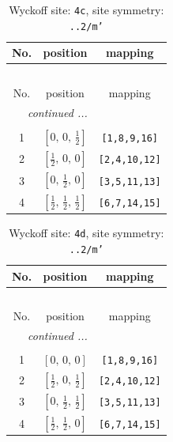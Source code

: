 \documentclass[fleqn,8pt]{jsarticle}
\begin{document}
\renewcommand{\arraystretch}{1.2}
\begin{longtable}{ccc}
\caption{Wyckoff site: {\tt 4c}, site symmetry: {\tt ..2/m'}}
 \\
 \hline \hline
No. & position & mapping \\ \hline \endfirsthead

\multicolumn{2}{l}{\tablename\ \thetable{}} \\
 \hline \hline
No. & position & mapping \\ \hline \endhead

 \hline \hline
\multicolumn{2}{r}{\footnotesize\it continued ...} \\ \endfoot

 \hline \hline
\multicolumn{2}{r}{} \\ \endlastfoot

1 & $\left[ 0,\, 0,\, \frac{1}{2} \right]$ & {\tt [1,8,9,16]} \\ \hline
2 & $\left[ \frac{1}{2},\, 0,\, 0 \right]$ & {\tt [2,4,10,12]} \\ \hline
3 & $\left[ 0,\, \frac{1}{2},\, 0 \right]$ & {\tt [3,5,11,13]} \\ \hline
4 & $\left[ \frac{1}{2},\, \frac{1}{2},\, \frac{1}{2} \right]$ & {\tt [6,7,14,15]} \\
\end{longtable}
\renewcommand{\arraystretch}{1.2}
\begin{longtable}{ccc}
\caption{Wyckoff site: {\tt 4d}, site symmetry: {\tt ..2/m'}}
 \\
 \hline \hline
No. & position & mapping \\ \hline \endfirsthead

\multicolumn{2}{l}{\tablename\ \thetable{}} \\
 \hline \hline
No. & position & mapping \\ \hline \endhead

 \hline \hline
\multicolumn{2}{r}{\footnotesize\it continued ...} \\ \endfoot

 \hline \hline
\multicolumn{2}{r}{} \\ \endlastfoot

1 & $\left[ 0,\, 0,\, 0 \right]$ & {\tt [1,8,9,16]} \\ \hline
2 & $\left[ \frac{1}{2},\, 0,\, \frac{1}{2} \right]$ & {\tt [2,4,10,12]} \\ \hline
3 & $\left[ 0,\, \frac{1}{2},\, \frac{1}{2} \right]$ & {\tt [3,5,11,13]} \\ \hline
4 & $\left[ \frac{1}{2},\, \frac{1}{2},\, 0 \right]$ & {\tt [6,7,14,15]} \\
\end{longtable}
\end{document}
